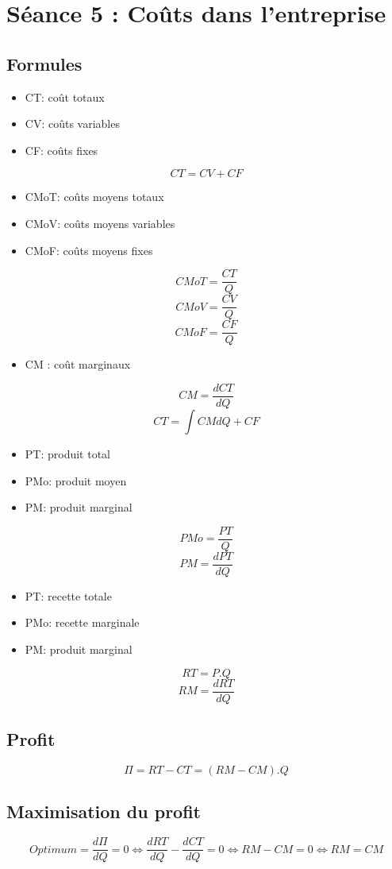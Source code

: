 \section{Séance 5 : Coûts dans l’entreprise}


\subsection{Formules}



\begin{itemize}
	\item CT: coût totaux
	\item CV: coûts variables
	\item CF: coûts fixes
\end{itemize}
$$CT=CV+CF$$


\begin{itemize}
	\item CMoT: coûts moyens totaux
	\item CMoV: coûts moyens variables
	\item CMoF: coûts moyens fixes
\end{itemize}
$$CMoT = \frac{CT}{Q}$$
$$CMoV = \frac{CV}{Q}$$
$$CMoF = \frac{CF}{Q}$$



\begin{itemize}
	\item CM : coût marginaux
\end{itemize}
$$CM  = \frac{dCT}{dQ}$$
$$CT = \int CM dQ + CF$$



\begin{itemize}
	\item PT: produit total
	\item PMo: produit moyen
	\item PM: produit marginal
\end{itemize}
$$PMo = \frac{PT}{Q}$$
$$PM = \frac{dPT}{dQ}$$



\begin{itemize}
	\item PT: recette totale
	\item PMo: recette marginale
	\item PM: produit marginal
\end{itemize}
$$RT = P.Q$$
$$RM  = \frac{dRT}{dQ}$$



\subsection{Profit}



$$\Pi=RT-CT=(RM-CM).Q$$



\subsection{Maximisation du profit}



$$Optimum = \frac{d\Pi}{dQ} = 0 \Leftrightarrow \frac{dRT}{dQ} - \frac{dCT}{dQ} = 0 \Leftrightarrow RM - CM = 0 \Leftrightarrow RM = CM$$